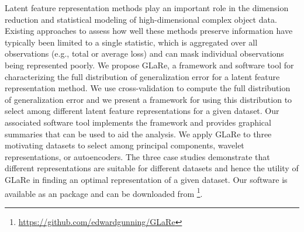 

Latent feature representation methods play an important role in the dimension reduction and statistical modeling of high-dimensional complex object data.
Existing approaches to assess how well these methods preserve information have typically been limited to a single statistic, which is aggregated over all observations (e.g., total or average loss) and can mask individual observations being represented poorly.
We propose GLaRe, a framework and software tool for characterizing the full distribution of generalization error for a latent feature representation method.
We use cross-validation to compute the full distribution of generalization error and we present a framework for using this distribution to select among different latent feature representations for a given dataset.
Our associated software tool implements the framework and provides graphical summaries that can be used to aid the analysis.
We apply GLaRe to three motivating datasets to select among principal components, wavelet representations, or autoencoders.
The three case studies demonstrate that different representations are suitable for different datasets and hence the utility of GLaRe in finding an optimal representation of a given dataset.
Our software is available as an  package and can be downloaded from \footnote{\url{https://github.com/edwardgunning/GLaRe}}.





